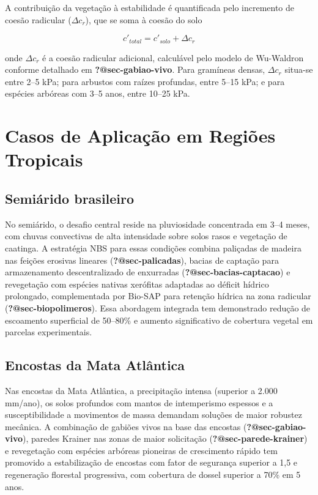\documentclass[
  portuguese,
  11pt,
  a4paper,
  open=any]{scrbook}
\begin{document}
A contribuição da vegetação à estabilidade é quantificada pelo
incremento de coesão radicular (\(\Delta c_r\)), que se soma à coesão do
solo

\[
c'_{total} = c'_{solo} + \Delta c_r
\]

onde \(\Delta c_r\) é a coesão radicular adicional, calculável pelo
modelo de Wu-Waldron conforme detalhado em \textbf{?@sec-gabiao-vivo}.
Para gramíneas densas, \(\Delta c_r\) situa-se entre 2--5 kPa; para
arbustos com raízes profundas, entre 5--15 kPa; e para espécies arbóreas
com 3--5 anos, entre 10--25 kPa.

\section{Casos de Aplicação em Regiões
Tropicais}\label{casos-de-aplicauxe7uxe3o-em-regiuxf5es-tropicais}

\subsection{Semiárido brasileiro}\label{semiuxe1rido-brasileiro}

No semiárido, o desafio central reside na pluviosidade concentrada em
3--4 meses, com chuvas convectivas de alta intensidade sobre solos rasos
e vegetação de caatinga. A estratégia NBS para essas condições combina
paliçadas de madeira nas feições erosivas lineares
(\textbf{?@sec-palicadas}), bacias de captação para armazenamento
descentralizado de enxurradas (\textbf{?@sec-bacias-captacao}) e
revegetação com espécies nativas xerófitas adaptadas ao déficit hídrico
prolongado, complementada por Bio-SAP para retenção hídrica na zona
radicular (\textbf{?@sec-biopolimeros}). Essa abordagem integrada tem
demonstrado redução de escoamento superficial de 50--80\% e aumento
significativo de cobertura vegetal em parcelas experimentais.

\subsection{Encostas da Mata
Atlântica}\label{encostas-da-mata-atluxe2ntica}

Nas encostas da Mata Atlântica, a precipitação intensa (superior a 2.000
mm/ano), os solos profundos com mantos de intemperismo espessos e a
susceptibilidade a movimentos de massa demandam soluções de maior
robustez mecânica. A combinação de gabiões vivos na base das encostas
(\textbf{?@sec-gabiao-vivo}), paredes Krainer nas zonas de maior
solicitação (\textbf{?@sec-parede-krainer}) e revegetação com espécies
arbóreas pioneiras de crescimento rápido tem promovido a estabilização
de encostas com fator de segurança superior a 1,5 e regeneração
florestal progressiva, com cobertura de dossel superior a 70\% em 5
anos.
\end{document}
